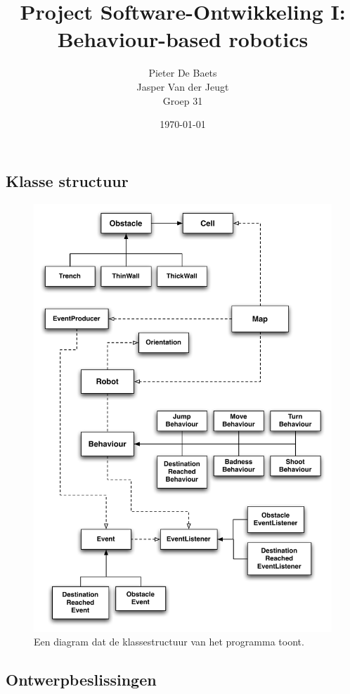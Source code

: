 \documentclass[a4paper]{article}
\title{Project Software-Ontwikkeling I: \\
       Behaviour-based robotics}
\author{Pieter De Baets \\
        Jasper Van der Jeugt \\
        Groep 31}
\date{\today}
\begin{document}
\maketitle
\subsection*{Klasse structuur}
\begin{figure}
\begin{center}
\includegraphics[width=\textwidth]{diagram.pdf}
\caption{Een diagram dat de klassestructuur van het programma toont.}
\label{fig:diagram}
\end{center}
\end{figure}

\subsection*{Ontwerpbeslissingen}
\end{document}
